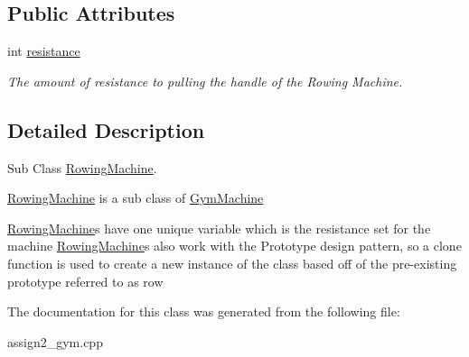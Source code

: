 \subsection*{Public Attributes}
\begin{DoxyCompactItemize}
\item 
\hypertarget{class_rowing_machine_a3c5f0c2e988e3e92cca2a02efb73d7fc}{}int \hyperlink{class_rowing_machine_a3c5f0c2e988e3e92cca2a02efb73d7fc}{resistance}\label{class_rowing_machine_a3c5f0c2e988e3e92cca2a02efb73d7fc}

\begin{DoxyCompactList}\small\item\em The amount of resistance to pulling the handle of the Rowing Machine. \end{DoxyCompactList}\end{DoxyCompactItemize}


\subsection{Detailed Description}
Sub Class \hyperlink{class_rowing_machine}{Rowing\+Machine}. 

\hyperlink{class_rowing_machine}{Rowing\+Machine} is a sub class of \hyperlink{class_gym_machine}{Gym\+Machine}

\hyperlink{class_rowing_machine}{Rowing\+Machine}\textquotesingle{}s have one unique variable which is the resistance set for the machine \hyperlink{class_rowing_machine}{Rowing\+Machine}\textquotesingle{}s also work with the Prototype design pattern, so a clone function is used to create a new instance of the class based off of the pre-\/existing prototype referred to as \textquotesingle{}row\textquotesingle{} 

The documentation for this class was generated from the following file\+:\begin{DoxyCompactItemize}
\item 
assign2\+\_\+gym.\+cpp\end{DoxyCompactItemize}
